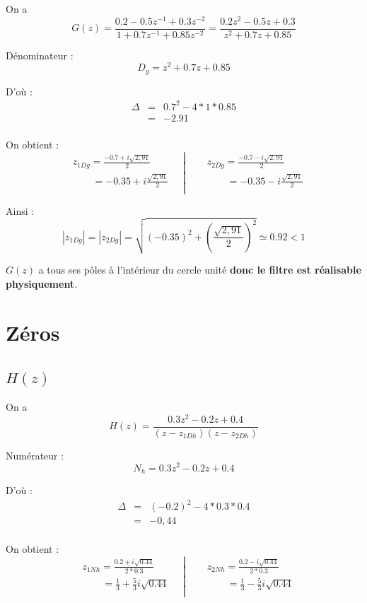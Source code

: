 \documentclass[12,french]{report}
\begin{document}
On a $$ G(z) = \frac{0.2-0.5z^{-1}+0.3z^{-2}}{1+0.7z^{-1}+0.85z^{-2}} = \frac{0.2z^2-0.5z+0.3}{z^2+0.7z+0.85} $$

Dénominateur : $$ D_g= z^2+0.7z+0.85 $$

D'où : $$ \begin{array}{ccl}
\Delta & = & 0.7^2-4*1*0.85 \\
	   & = & -2.91 \\
\end{array} $$

On obtient :
$$\left.\begin{aligned}
	&z_{1Dg} = \frac{-0.7+i\sqrt{2,91}}{2} \\
	&\quad\quad = -0.35 + i\frac{\sqrt{2,91}}{2} \\
\end{aligned}\quad\right|
\quad\left.\begin{aligned}
	&z_{2Dg} = \frac{-0.7-i\sqrt{2,91}}{2}\\
	&\quad\quad =-0.35 - i\frac{\sqrt{2,91}}{2} \\
\end{aligned}\right.$$

Ainsi :
$$ |z_{1Dg}|=|z_{2Dg}|=\sqrt{(-0.35)^2+\left(\frac{\sqrt{2,91}}{2}\right)^2} \simeq 0.92 < 1 $$


$G(z)$ a tous ses pôles à l'intérieur du cercle unité \textbf{donc le filtre est réalisable physiquement}.

\section{Zéros}

\subsection{$H(z)$}

\vspace{0.25cm}

On a $$ H(z) = \frac{0.3z^2-0.2z+0.4}{(z-z_{1Dh})(z-z_{2Dh})} $$

Numérateur : $$ N_h= 0.3z^2-0.2z+0.4 $$

D'où : $$ \begin{array}{ccl}
\Delta & = & (-0.2)^2-4*0.3*0.4 \\
	   & = & -0,44 \\
\end{array} $$

On obtient :
$$\left.\begin{aligned}
	&z_{1Nh} = \frac{0.2+i\sqrt{0.44}}{2*0.3} \\
	&\quad\quad = \frac{1}{3} + \frac{5}{3}i\sqrt{0.44} \\
\end{aligned}\quad\right|
\quad\left.\begin{aligned}
	&z_{2Nh} = \frac{0.2-i\sqrt{0.44}}{2*0.3}\\
	&\quad\quad = \frac{1}{3} - \frac{5}{3}i\sqrt{0.44} \\
\end{aligned}\right.$$
\end{document}
